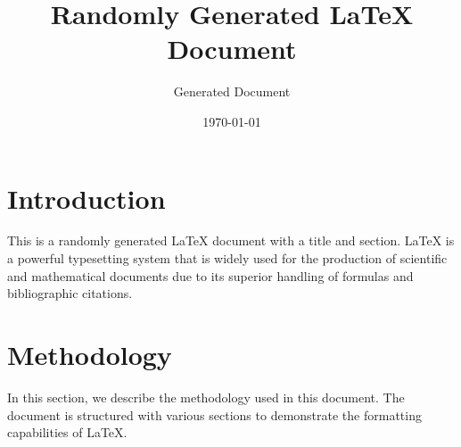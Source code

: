 \documentclass{article}
\title{Randomly Generated LaTeX Document}
\author{Generated Document}
\date{\today}
\begin{document}
\maketitle

\section{Introduction}
This is a randomly generated LaTeX document with a title and section. LaTeX is a powerful typesetting system that is widely used for the production of scientific and mathematical documents due to its superior handling of formulas and bibliographic citations.

\section{Methodology}
In this section, we describe the methodology used in this document. The document is structured with various sections to demonstrate the formatting capabilities of LaTeX.
\end{document}
